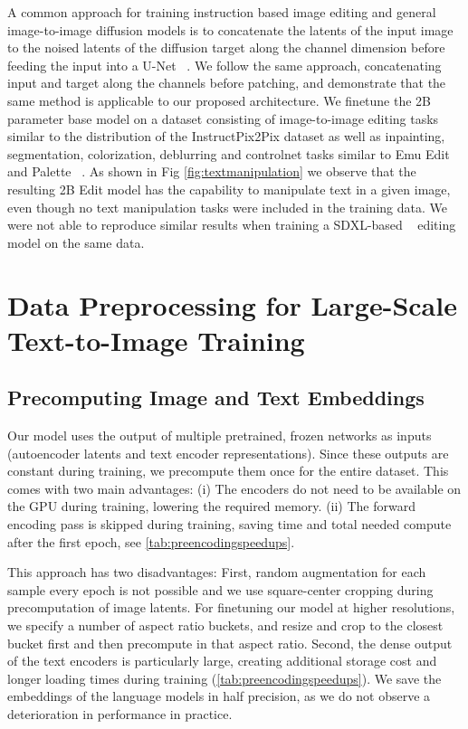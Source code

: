 A common approach for training instruction based image editing and general image-to-image diffusion models is to concatenate the latents of the input image to the noised latents of the diffusion target along the channel dimension before feeding the input into a U-Net ~\citep{brooks2023instructpix2pix, sheynin2023emu, saharia2022palette, saharia2022image}. We follow the same approach, concatenating input and target along the channels before patching, and demonstrate  that the same method is applicable to our proposed architecture. We finetune the 2B parameter base model on a dataset consisting of image-to-image editing tasks similar to the distribution of the InstructPix2Pix dataset \citep{brooks2023instructpix2pix} as well as inpainting, segmentation, colorization, deblurring and controlnet tasks similar to Emu Edit and Palette ~\citep{sheynin2023emu, saharia2022palette}. As shown in Fig \ref{fig:textmanipulation} we observe that the resulting 2B Edit model has the capability to manipulate text in a given image, even though no text manipulation tasks were included in the training data. We were not able to reproduce similar results when training a SDXL-based ~\citep{podell2023sdxl} editing model on the same data. 

\textmanipulation


\section{Data Preprocessing for Large-Scale Text-to-Image Training}
\label{suppsec:datepreproc}
%
%
%
%
%
%
%
%
%
%
%
%
%
%
%
%
%
%
%
%
%
%
%
%
%

\subsection{Precomputing Image and Text Embeddings}
\label{suppsec:precomputingembeddings}
%
%
%
Our model uses the output of multiple pretrained, frozen networks as inputs (autoencoder latents and text encoder representations). %
Since these outputs are constant during training, we precompute them once for the entire dataset.
%
%
This comes with two main advantages: (i) The encoders do not need to be available on the GPU during training, lowering the required memory. (ii) The forward encoding pass is skipped during training, saving time and total needed compute after the first epoch, see \cref{tab:preencodingspeedups}.
%

\preencodingspeedups

This approach has two disadvantages: First, random augmentation for each sample every epoch is not possible and we use square-center cropping during precomputation of image latents. For finetuning our model at higher resolutions, we specify a number of aspect ratio buckets, and resize and crop to the closest bucket first and then precompute in that aspect ratio. 
Second, the dense output of the text encoders is particularly large, creating additional storage cost and longer loading times during training (\cf \cref{tab:preencodingspeedups}).
We save the embeddings of the language models in half precision, as we do not observe a deterioration in performance in practice.

